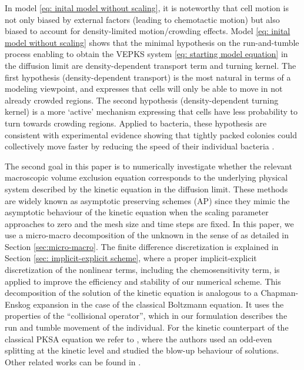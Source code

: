 \documentclass{aims} %
\theoremstyle{definition}
\begin{document}
{In model \eqref{eq: inital model without scaling}, it is noteworthy that cell motion is not only biased by external factors (leading to chemotactic motion) but also biased to account for density-limited motion/crowding effects. Model \eqref{eq: inital model without scaling} shows that the minimal hypothesis on the run-and-tumble process enabling to obtain the VEPKS system \eqref{eq: starting model equation} in the diffusion limit are density-dependent transport term and turning kernel. The first hypothesis (density-dependent transport) is the most natural in terms of a modeling viewpoint, and expresses that cells will only be able to move in not already crowded regions. The second hypothesis (density-dependent turning kernel) is a more `active' mechanism expressing that cells have less probability to turn towards crowding regions. Applied to bacteria, these hypothesis are consistent with experimental evidence showing that tightly packed colonies could collectively move faster by reducing the speed of their individual bacteria \cite{Meacock2021}.} 

The second goal in this paper is to numerically investigate whether the relevant macroscopic volume exclusion equation corresponds to the underlying physical system described by the kinetic equation {in the diffusion limit}. These methods are widely known as asymptotic preserving schemes (AP) \cite{filbet2010class,jin1999efficient} since they mimic the asymptotic behaviour of the kinetic equation when the scaling parameter approaches to zero and the mesh size and time steps are fixed. In this paper, we use a micro-macro decomposition of the unknown in the sense of  \cite{LemouMieussens} as detailed in Section \ref{sec:micro-macro}. {The finite difference discretization is explained in Section  \ref{sec: implicit-explicit scheme}, where a proper implicit-explicit discretization of the nonlinear terms, including the chemosensitivity term, is applied to improve the efficiency and stability of our numerical scheme.} This decomposition of the solution of the kinetic equation is analogous to a Chapman-Enskog expansion in the case of the classical Boltzmann equation. It uses the properties of the ``collisional operator'', which in our formulation describes the run and tumble movement of the individual. For the kinetic counterpart of the classical PKSA equation we refer to \cite{carrillo2013asymptotic}, where the authors used an odd-even splitting at the kinetic level and studied {the blow-up behaviour of solutions.}
Other related works can be found in \cite{emako2016well,wang2019asymptotic,jin2011class,chertock2019high}. 
\end{document}

